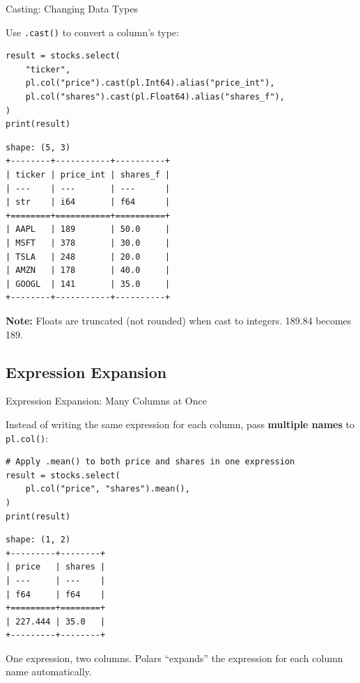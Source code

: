\documentclass[9pt,aspectratio=169]{beamer}
\newcommand{\py}[1]{\lstinline[language=Python]{#1}}
\begin{document}
\begin{frame}[fragile]{Casting: Changing Data Types}

Use \py{.cast()} to convert a column's type:

\begin{lstlisting}
result = stocks.select(
    "ticker",
    pl.col("price").cast(pl.Int64).alias("price_int"),
    pl.col("shares").cast(pl.Float64).alias("shares_f"),
)
print(result)
\end{lstlisting}

\begin{lstlisting}[style=output]
shape: (5, 3)
+--------+-----------+----------+
| ticker | price_int | shares_f |
| ---    | ---       | ---      |
| str    | i64       | f64      |
+========+===========+==========+
| AAPL   | 189       | 50.0     |
| MSFT   | 378       | 30.0     |
| TSLA   | 248       | 20.0     |
| AMZN   | 178       | 40.0     |
| GOOGL  | 141       | 35.0     |
+--------+-----------+----------+
\end{lstlisting}
\vspace{-0.3em}
\textbf{Note:} Floats are \alert{truncated} (not rounded) when cast to integers. 189.84 becomes 189.

\end{frame}


\subsection{Expression Expansion}
\begin{frame}[fragile]{Expression Expansion: Many Columns at Once}

Instead of writing the same expression for each column, pass \textbf{multiple names} to \py{pl.col()}:

\begin{lstlisting}
# Apply .mean() to both price and shares in one expression
result = stocks.select(
    pl.col("price", "shares").mean(),
)
print(result)
\end{lstlisting}

\begin{lstlisting}[style=output]
shape: (1, 2)
+---------+--------+
| price   | shares |
| ---     | ---    |
| f64     | f64    |
+=========+========+
| 227.444 | 35.0   |
+---------+--------+
\end{lstlisting}

\medskip

One expression, two columns. Polars ``expands'' the expression for each column name automatically.

\end{frame}
\end{document}
